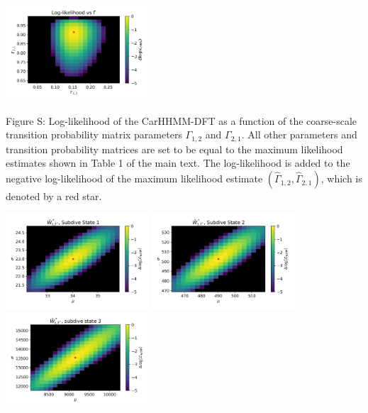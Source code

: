 \documentclass{article}
\begin{document}
        
        \begin{center}
        \includegraphics[width=2.1in]{../Plots/2019/20190902-182840-CATs_OB_1_0_267_CarHHMM2_coarse-gamma-likelihood.png}
        \end{center}
        
        \noindent Figure S: Log-likelihood of the CarHHMM-DFT as a function of the coarse-scale transition probability matrix parameters $\Gamma_{1,2}$ and $\Gamma_{2,1}$. All other parameters and transition probability matrices are set to be equal to the maximum likelihood estimates shown in Table 1 of the main text. The log-likelihood is added to the negative log-likelihood of the maximum likelihood estimate $(\hat \Gamma_{1,2},\hat \Gamma_{2,1})$, which is denoted by a red star.
        \addtocounter{fignum}{1}
        
        \begin{center}
        \includegraphics[width=2.1in]{../Plots/2019/20190902-182840-CATs_OB_1_0_267_CarHHMM2_fine-theta-likelihood-Ahat_low-0.png}
        \includegraphics[width=2.1in]{../Plots/2019/20190902-182840-CATs_OB_1_0_267_CarHHMM2_fine-theta-likelihood-Ahat_low-1.png}
        \includegraphics[width=2.1in]{../Plots/2019/20190902-182840-CATs_OB_1_0_267_CarHHMM2_fine-theta-likelihood-Ahat_low-2.png}
        \end{center}
        
\end{document}

